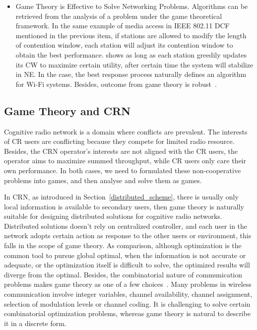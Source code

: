 \begin{itemize}
\item Game Theory is Effective to Solve Networking Problems. 
Algorithms can be retrieved from the analysis of a problem under the game theoretical framework.
In the same example of media access in IEEE 802.11 DCF mentioned in the previous item, if stations are allowed to modify the length of contention window, each station will adjust its contention window to obtain the best performance.
\cite{contentiongame_07} shows as long as each station greedily updates its CW to maximize certain utility, after certain time the system will stabilize in NE. 
In the case, the best response process naturally defines an algorithm for Wi-Fi systems.
%
Besides, outcome from game theory is robust~\cite{Han:2008:RAW:1457343}.
\end{itemize}







\subsection{Game Theory and CRN}
Cognitive radio network is a domain where conflicts are prevalent.
The interests of CR users are conflicting because they compete for limited radio resource.
Besides, the CRN operator's interests are not aligned with the CR users, \eg the operator aims to maximize summed throughput, while CR users only care their own performance.
In both cases, we need to formulated these non-cooperative problems into games, and then analyse and solve them as games.

In CRN, as introduced in Section~\ref{distributed_scheme}, there is usually only local information is available to secondary users, then game theory is naturally suitable for designing distributed solutions for cognitive radio networks.
Distributed solutions doesn't rely on centralized controller, and each user in the network adopts certain action as response to the other users or environment, this falls in the scope of game theory.
As comparison, although optimization is the common tool to pursue global optimal, when the information is not accurate or adequate, or the optimization itself is difficult to solve, the optimized results will diverge from the optimal.
Besides, the combinatorial nature of communication problems makes game theory as one of a few choices~\cite{Han:2008:RAW:1457343}.
Many problems in wireless communication involve integer variables, \ie channel availability, channel assignment, selection of modulation levels or channel coding.
It is challenging to solve certain combinatorial optimization problems, whereas game theory is natural to describe it in a discrete form.

